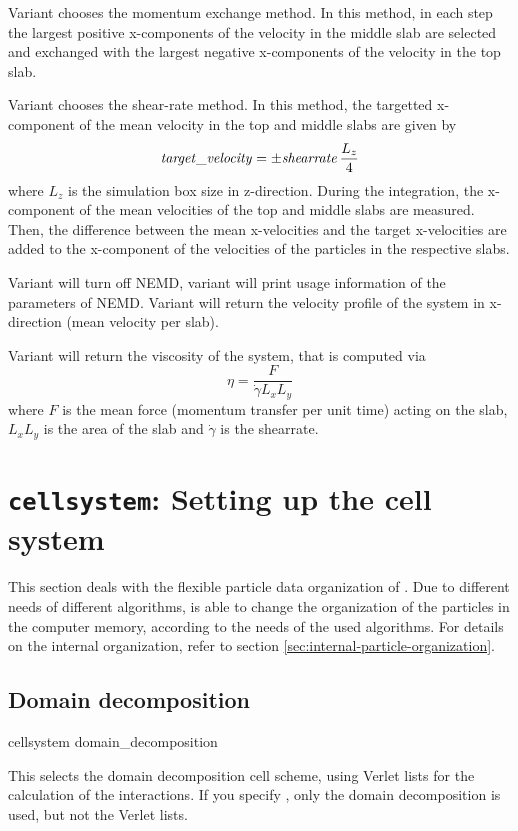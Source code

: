 Variant  chooses the momentum exchange method.  In this
method, in each step the  largest positive
x-components of the velocity in the middle slab are selected and
exchanged with the  largest negative x-components of
the velocity in the top slab. 

Variant  chooses the shear-rate method. In this method, the
targetted x-component of the mean velocity in the top and middle slabs
are given by 
\begin{equation}
  \mathrm{\mathit{target\_velocity}} = \pm \mathrm{\mathit{shearrate}}\,\frac{L_z}{4}
\end{equation}
where $L_z$ is the simulation box size in z-direction. During the
integration, the x-component of the mean velocities of the top and
middle slabs are measured.  Then, the difference between the mean
x-velocities and the target x-velocities are added to the x-component
of the velocities of the particles in the respective slabs. 

Variant  will turn off NEMD, variant  will
print usage information of the parameters of NEMD. Variant  will return the
velocity profile of the system in x-direction (mean velocity per slab).

Variant  will return the viscosity of the system, that is
computed via
\begin{equation}
  \eta = \frac{F}{\dot{\gamma} L_x L_y}
\end{equation}
where $F$ is the mean force (momentum transfer per unit time) acting
on the slab, $L_x L_y$ is the area of the slab and $\dot{\gamma}$ is the shearrate. 


\section{\texttt{cellsystem}: Setting up the cell system}
\label{sec:cell-systems}

This section deals with the flexible particle data organization of
\es.  Due to different needs of different algorithms, \es is able to
change the organization of the particles in the computer memory,
according to the needs of the used algorithms. For details on the
internal organization, refer to section
\vref{sec:internal-particle-organization}.

\subsection{Domain decomposition}
\begin{essyntax}
  cellsystem domain_decomposition 
\end{essyntax}
This selects the domain decomposition cell scheme, using Verlet lists
for the calculation of the interactions. If you specify
, only the domain decomposition is used, but
not the Verlet lists.

